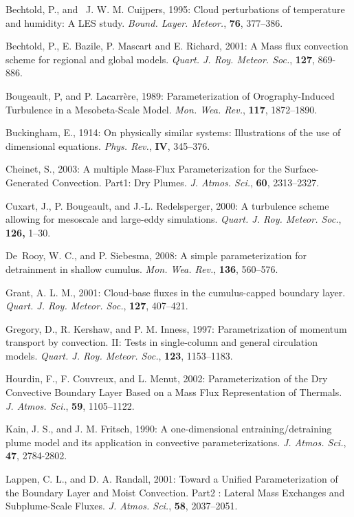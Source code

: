 \noindent \por
Bechtold, P., and~ J. W. M. Cuijpers, 1995:
Cloud perturbations of temperature and humidity: A LES study.
{\it Bound. Layer. Meteor.}, {\bf 76}, 377--386.

\noindent \por
Bechtold, P., E. Bazile, P. Mascart and E. Richard, 2001:
A Mass flux convection scheme for regional and global models.
{\it Quart. J. Roy. Meteor. Soc.}, {\bf 127}, 869-886.

\noindent \por
Bougeault, P, and P. Lacarr\`ere, 1989: Parameterization of Orography-Induced
  Turbulence in a Mesobeta-Scale Model.
{\it Mon. Wea. Rev.}, {\bf 117}, 1872--1890.

\noindent \por
Buckingham, E., 1914: On physically similar systems: Illustrations of the use of
  dimensional equations.
{\it Phys. Rev.}, {\bf IV}, 345--376.

\noindent \por
Cheinet, S., 2003: A multiple Mass-Flux Parameterization for the
  Surface-Generated Convection. Part1: Dry Plumes.
{\it J. Atmos. Sci.}, {\bf 60}, 2313--2327.

\noindent \por
Cuxart, J., P. Bougeault, and J.-L. Redelsperger, 2000:
A turbulence scheme allowing for mesoscale and large-eddy simulations.
{\it Quart. J. Roy. Meteor. Soc.}, {\bf 126,} 1--30.

\noindent \por
De~Rooy, W. C., and P. Siebesma, 2008:
 A simple parameterization for detrainment in shallow cumulus.
{\it Mon. Wea. Rev.}, {\bf 136}, 560--576.

\noindent \por
Grant, A. L. M., 2001: Cloud-base fluxes in the cumulus-capped boundary layer.
{\it Quart. J. Roy. Meteor. Soc.}, {\bf 127}, 407--421.

\noindent \por
Gregory, D., R. Kershaw, and P. M. Inness, 1997:
 Parametrization of momentum transport by
  convection. II: Tests in single-column and general circulation models.
{\it Quart. J. Roy. Meteor. Soc.}, {\bf 123}, 1153--1183.

\noindent \por
Hourdin, F., F. Couvreux, and L. Menut, 2002:
 Parameterization of the Dry Convective
  Boundary Layer Based on a Mass Flux Representation of Thermals.
{\it J. Atmos. Sci.}, {\bf 59}, 1105--1122.

\noindent \por
Kain, J. S., and J. M. Fritsch, 1990: A one-dimensional
entraining/detraining plume model and its application in
convective parameterizations. {\it J. Atmos. Sci.},
{\bf 47}, 2784-2802.

\noindent \por
Lappen, C. L., and D. A. Randall, 2001:
Toward a Unified Parameterization of the Boundary Layer and Moist Convection. 
Part2 : Lateral Mass Exchanges and Subplume-Scale Fluxes.
{\it J. Atmos. Sci.}, {\bf 58}, 2037--2051.

